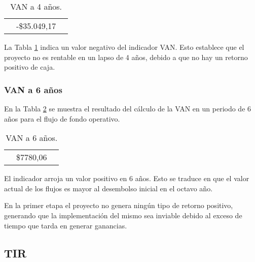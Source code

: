 \begin{table}[H]
  \centering
    \begin{tabular}{|cc|r|}
    \rowcolor[rgb]{ .773,  .851,  .945} \multicolumn{3}{c}{\textbf{a 4 años}} \bigstrut[b]\\
    \hline
    \rowcolor[rgb]{ .773,  .851,  .945} \multicolumn{2}{|c|}{\textbf{VAN }} & \cellcolor[rgb]{ 1,  1,  1}\textcolor[rgb]{ 1,  0,  0}{-\$35.049,17} \bigstrut\\
    \hline
    \end{tabular}%
  \caption{VAN a 4 años.}  
  \label{tab:van-4}%
\end{table}%


La Tabla \ref{tab:van-4} indica un valor negativo del indicador VAN. Esto establece que el proyecto no es rentable en un lapso de 4 años, debido a que no hay un retorno positivo de caja. 

\subsubsection{VAN a 6 años}

En la Tabla \ref{tab:van-6} se muestra el resultado del cálculo de la VAN en un periodo de 6 años para el flujo de fondo operativo.

\begin{table}[H]
  \centering

    \begin{tabular}{|cc|r|}
    \rowcolor[rgb]{ .773,  .851,  .945} \multicolumn{3}{c}{\textbf{a 8 años}} \bigstrut[b]\\
    \hline
    \rowcolor[rgb]{ .773,  .851,  .945} \multicolumn{2}{|c|}{\textbf{VAN }} & \cellcolor[rgb]{ 1,  1,  1}\$7780,06 \bigstrut\\
    \hline
    \end{tabular}%
  \caption{VAN a 6 años.}    
  \label{tab:van-6}%
\end{table}%


El indicador arroja un valor positivo en 6 años. Esto se traduce en que el valor actual de los flujos es mayor al desembolso inicial en el octavo año.

En la primer etapa el proyecto no genera ningún tipo de retorno positivo, generando que la implementación del mismo sea inviable debido al exceso de tiempo que tarda en generar ganancias.

\subsection{TIR}

